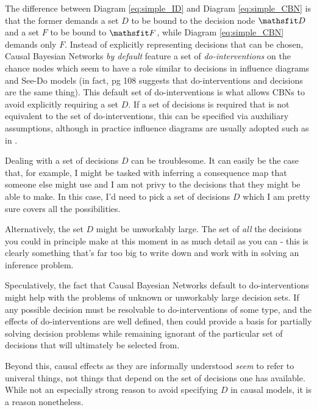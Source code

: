 The difference between Diagram \ref{eq:simple_ID} and Diagram \ref{eq:simple_CBN} is that the former demands a set $D$ to be bound to the decision node $\nod{D}$ and a set $F$ to be bound to $\nod{F}$, while Diagram \ref{eq:simple_CBN} demands only $F$. Instead of explicitly representing decisions that can be chosen, Causal Bayesian Networks \emph{by default} feature a set of \emph{do-interventions} on the chance nodes which seem to have a role similar to decisions in influence diagrams and See-Do models (in fact, \citet{pearl_causality:_2009} pg 108 suggests that do-interventions and decisions are the same thing). This default set of do-interventions is what allows CBNs to avoid explicitly requiring a set $D$. If a set of decisions is required that is not equivalent to the set of do-interventions, this can be specified via auxhiliary assumptions, although in practice influence diagrams are usually adopted such as in \citep{yang_characterizing_2018} .

Dealing with a set of decisions $D$ can be troublesome. It can easily be the case that, for example, I might be tasked with inferring a consequence map that someone else might use and I am not privy to the decisions that they might be able to make. In this case, I'd need to pick a set of decisions $D$ which I am pretty sure covers all the possibilities. 

Alternatively, the set $D$ might be unworkably large. The set of \emph{all} the decisions you could in principle make at this moment in as much detail as you can - this is clearly something that's far too big to write down and work with in solving an inference problem.

Speculatively, the fact that Causal Bayesian Networks default to do-interventions might help with the problems of unknown or unworkably large decision sets. If any possible decision must be resolvable to do-interventions of some type, and the effects of do-interventions are well defined, then could provide a basis for partially solving  decision problems while remaining ignorant of the particular set of decisions that will ultimately be selected from.

Beyond this, causal effects as they are informally understood \emph{seem} to refer to univeral things, not things that depend on the set of decisions one has available. While not an especially strong reason to avoid specifying $D$ in causal models, it is a reason nonetheless.

